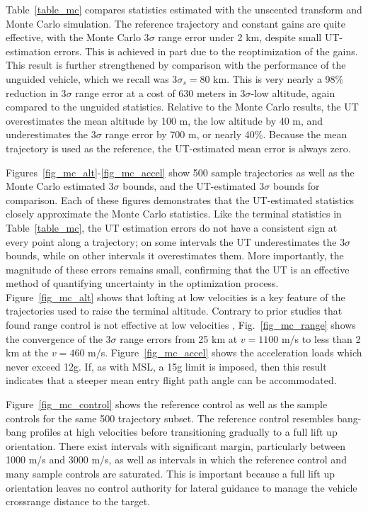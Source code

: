 Table~\ref{table_mc} compares statistics estimated with the unscented transform and Monte Carlo simulation. The reference trajectory and constant gains are quite effective, with the Monte Carlo 3$ \sigma $ range error under 2 km, despite small UT-estimation errors. This is achieved in part due to the reoptimization of the gains. This result is further strengthened by comparison with the performance of the unguided vehicle, which we recall was 3$\sigma_s = 80$ km. This is very nearly a 98\% reduction in 3$\sigma$ range error at a cost of 630 meters in 3$\sigma$-low altitude, again compared to the unguided statistics.
Relative to the Monte Carlo results, the UT overestimates the mean altitude by 100 m, the low altitude by 40 m, and underestimates the 3$\sigma $ range error by 700 m, or nearly 40\%. Because the mean trajectory is used as the reference, the UT-estimated mean error is always zero.

Figures~\ref{fig_mc_alt}-\ref{fig_mc_accel} show 500 sample trajectories as well as the Monte Carlo estimated 3$\sigma$ bounds, and the UT-estimated 3$\sigma$ bounds for comparison. Each of these figures demonstrates that the UT-estimated statistics closely approximate the Monte Carlo statistics. Like the terminal statistics in Table~\ref{table_mc}, the UT estimation errors do not have a consistent sign at every point along a trajectory; on some intervals the UT underestimates the 3$\sigma$ bounds, while on other intervals it overestimates them. More importantly, the magnitude of these errors remains small, confirming that the UT is an effective method of quantifying uncertainty in the optimization process. 
Figure~\ref{fig_mc_alt} shows that lofting at low velocities is a key feature of the trajectories used to raise the terminal altitude. Contrary to prior studies that found range control is not effective at low velocities \cite{MSL_EDL2}, Fig.~\ref{fig_mc_range} shows the convergence of the 3$\sigma$ range errors from 25 km at $ v=1100 $ m/s to less than 2 km at the $v=460$ m/s. 
Figure~\ref{fig_mc_accel} shows the acceleration loads which never exceed 12g. If, as with MSL, a 15g limit is imposed, then this result indicates that a steeper mean entry flight path angle can be accommodated.

Figure~\ref{fig_mc_control} shows the reference control as well as the sample controls for the same 500 trajectory subset. The reference control resembles bang-bang profiles at high velocities before transitioning gradually to a full lift up orientation. There exist intervals with significant margin, particularly between 1000 m/s and 3000 m/s, as well as intervals in which the reference control and many sample controls are saturated. 
This is important because a full lift up orientation leaves no control authority for lateral guidance to manage the vehicle crossrange distance to the target.

